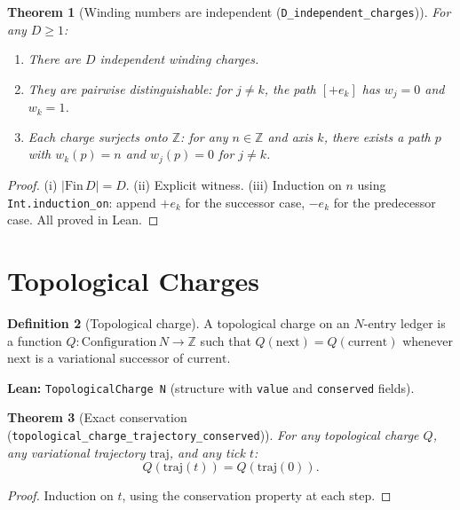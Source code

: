 \documentclass[11pt,a4paper]{article}
\theoremstyle{plain}
\newtheorem{theorem}{Theorem}[section]
\theoremstyle{definition}
\newtheorem{definition}[theorem]{Definition}
\theoremstyle{remark}
\newcommand{\Z}{\mathbb{Z}}
\begin{document}
\begin{theorem}[Winding numbers are independent {\normalfont(\texttt{D\_independent\_charges})}]
\label{thm:independent}
For any $D \geq 1$:
\begin{enumerate}[nosep,label=(\roman*)]
\item There are $D$ independent winding charges.
\item They are pairwise distinguishable: for $j \neq k$, the path
  $[+e_k]$ has $w_j = 0$ and $w_k = 1$.
\item Each charge surjects onto $\Z$: for any $n \in \Z$ and axis $k$,
  there exists a path $p$ with $w_k(p) = n$ and $w_j(p) = 0$ for
  $j \neq k$.
\end{enumerate}
\end{theorem}

\begin{proof}
(i) $|\text{Fin}\,D| = D$.
(ii) Explicit witness.
(iii) Induction on $n$ using \texttt{Int.induction\_on}: append $+e_k$
for the successor case, $-e_k$ for the predecessor case.
All proved in Lean.
\end{proof}

\section{Topological Charges}
\label{sec:topo-charge}

\begin{definition}[Topological charge]
A topological charge on an $N$-entry ledger is a function
$Q : \text{Configuration}\,N \to \Z$ such that
$Q(\text{next}) = Q(\text{current})$
whenever $\text{next}$ is a variational successor of $\text{current}$.
\end{definition}

\noindent\textbf{Lean:} \texttt{TopologicalCharge N} (structure with
\texttt{value} and \texttt{conserved} fields).

\begin{theorem}[Exact conservation {\normalfont(\texttt{topological\_charge\_trajectory\_conserved})}]
\label{thm:exact-conserved}
For any topological charge $Q$, any variational trajectory
$\text{traj}$, and any tick $t$:
\[
  Q(\text{traj}(t)) = Q(\text{traj}(0)).
\]
\end{theorem}

\begin{proof}
Induction on $t$, using the conservation property at each step.
\end{proof}
\end{document}
